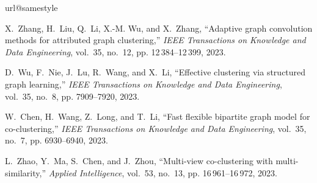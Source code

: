 \documentclass[letterpaper, 10 pt, conference]{ieeeconf}  %
\begin{document}
\begin{thebibliography}{10}
        \providecommand{\url}[1]{#1}
        \csname url@samestyle\endcsname
        \providecommand{\newblock}{\relax}
        \providecommand{\bibinfo}[2]{#2}
        \providecommand{\BIBentrySTDinterwordspacing}{\spaceskip=0pt\relax}
        \providecommand{\BIBentryALTinterwordstretchfactor}{4}
        \providecommand{\BIBentryALTinterwordspacing}{\spaceskip=\fontdimen2\font plus
                \BIBentryALTinterwordstretchfactor\fontdimen3\font minus
                \fontdimen4\font\relax}
        \providecommand{\BIBforeignlanguage}[2]{{%
                                \expandafter\ifx\csname l@#1\endcsname\relax
                                        \typeout{** WARNING: IEEEtran.bst: No hyphenation pattern has been}%
                                        \typeout{** loaded for the language `#1'. Using the pattern for}%
                                        \typeout{** the default language instead.}%
                                \else
                                        \language=\csname l@#1\endcsname
                                \fi
                                #2}}
        \providecommand{\BIBdecl}{\relax}
        \BIBdecl

        X.~Zhang, H.~Liu, Q.~Li, X.-M. Wu, and X.~Zhang, ``Adaptive graph convolution
        methods for attributed graph clustering,'' \emph{IEEE Transactions on
                Knowledge and Data Engineering}, vol.~35, no.~12, pp. 12\,384--12\,399, 2023.

        D.~Wu, F.~Nie, J.~Lu, R.~Wang, and X.~Li, ``Effective clustering via structured
        graph learning,'' \emph{IEEE Transactions on Knowledge and Data Engineering},
        vol.~35, no.~8, pp. 7909--7920, 2023.

        W.~Chen, H.~Wang, Z.~Long, and T.~Li, ``Fast flexible bipartite graph model for
        co-clustering,'' \emph{IEEE Transactions on Knowledge and Data Engineering},
        vol.~35, no.~7, pp. 6930--6940, 2023.

        L.~Zhao, Y.~Ma, S.~Chen, and J.~Zhou, ``Multi-view co-clustering with
        multi-similarity,'' \emph{Applied Intelligence}, vol.~53, no.~13, pp.
        16\,961--16\,972, 2023.


\end{thebibliography}
\end{document}
